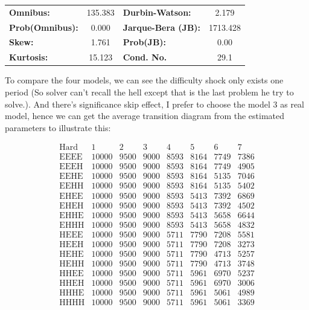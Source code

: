 \documentclass{article}
\begin{document}
\begin{center}
\begin{tabular}{lccccc}
\end{tabular}
\begin{tabular}{lclc}
\textbf{Omnibus:}       & 135.383 & \textbf{  Durbin-Watson:     } &    2.179  \\
\textbf{Prob(Omnibus):} &   0.000 & \textbf{  Jarque-Bera (JB):  } & 1713.428  \\
\textbf{Skew:}          &   1.761 & \textbf{  Prob(JB):          } &     0.00  \\
\textbf{Kurtosis:}      &  15.123 & \textbf{  Cond. No.          } &     29.1  \\
\bottomrule
\end{tabular}
\end{center}


To compare the four models, we can see the difficulty shock only exists one period (So solver can't
recall the hell except that is the last problem he try to solve.). And there's significance skip effect, I prefer
to choose the model 3 as real model, hence we can get the average transition diagram
from the estimated parameters to illustrate this:

\[
\begin{array}{c|ccccccc}
\mathrm{Hard} & 1 & 2& 3 & 4 & 5 & 6 &7 \\
\hline
\mathrm{EEEE} & 10000 & 9500 & 9000 & 8593 & 8164 & 7749 & 7386 \\
\mathrm{EEEH} & 10000 & 9500 & 9000 & 8593 & 8164 & 7749 & 4905 \\
\mathrm{EEHE} & 10000 & 9500 & 9000 & 8593 & 8164 & 5135 & 7046 \\
\mathrm{EEHH} & 10000 & 9500 & 9000 & 8593 & 8164 & 5135 & 5402 \\
\mathrm{EHEE} & 10000 & 9500 & 9000 & 8593 & 5413 & 7392 & 6869 \\
\mathrm{EHEH} & 10000 & 9500 & 9000 & 8593 & 5413 & 7392 & 4502 \\
\mathrm{EHHE} & 10000 & 9500 & 9000 & 8593 & 5413 & 5658 & 6644 \\
\mathrm{EHHH} & 10000 & 9500 & 9000 & 8593 & 5413 & 5658 & 4832 \\
\mathrm{HEEE} & 10000 & 9500 & 9000 & 5711 & 7790 & 7208 & 5581 \\
\mathrm{HEEH} & 10000 & 9500 & 9000 & 5711 & 7790 & 7208 & 3273 \\
\mathrm{HEHE} & 10000 & 9500 & 9000 & 5711 & 7790 & 4713 & 5257 \\
\mathrm{HEHH} & 10000 & 9500 & 9000 & 5711 & 7790 & 4713 & 3748 \\
\mathrm{HHEE} & 10000 & 9500 & 9000 & 5711 & 5961 & 6970 & 5237 \\
\mathrm{HHEH} & 10000 & 9500 & 9000 & 5711 & 5961 & 6970 & 3006 \\
\mathrm{HHHE} & 10000 & 9500 & 9000 & 5711 & 5961 & 5061 & 4989 \\
\mathrm{HHHH} & 10000 & 9500 & 9000 & 5711 & 5961 & 5061 & 3369 \\
\end{array}
\]
\end{document}
